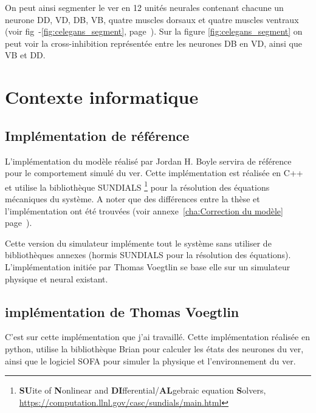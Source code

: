 On peut ainsi segmenter le ver en 12 unités neurales contenant chacune un neurone DD, VD,
DB, VB, quatre muscles dorsaux et quatre muscles ventraux (voir fig~-\ref{fig:celegans_segment},
page~\pageref{fig:celegans_segment}). Sur la figure \ref{fig:celegans_segment} on peut voir la
cross-inhibition représentée entre les neurones DB en VD, ainsi que VB et DD.



\section{Contexte informatique} %
\label{sec:Contexte informatique}

\subsection{Implémentation de référence} %
\label{sub:implémentation de référence}

L'implémentation du modèle réalisé par Jordan H. Boyle servira de référence
pour le comportement simulé du ver. Cette implémentation est réalisée en C++ et
utilise la bibliothèque SUNDIALS \footnote{\textbf{SU}ite of \textbf{N}onlinear and
\textbf{DI}fferential/\textbf{AL}gebraic equation \textbf{S}olvers,
\url{https://computation.llnl.gov/casc/sundials/main.html}} pour la résolution
des équations mécaniques du système. A noter que des différences entre la thèse
et l'implémentation ont été trouvées (voir annexe~\ref{cha:Correction du modèle}
page~\pageref{cha:Correction du modèle}).

Cette version du simulateur implémente tout le système sans utiliser de bibliothèques
annexes (hormis SUNDIALS pour la résolution des équations). L'implémentation initiée
par Thomas Voegtlin se base elle sur un simulateur physique et neural existant.


\subsection{implémentation de Thomas Voegtlin} %
\label{sub:implémentation de Thomas Voegtlin}

C'est sur cette implémentation que j'ai travaillé. Cette implémentation réalisée
en python, utilise la bibliothèque Brian\cite{Goodman2008} pour calculer les états
des neurones du ver, ainsi que le logiciel SOFA pour simuler la physique et
l'environnement du ver.


